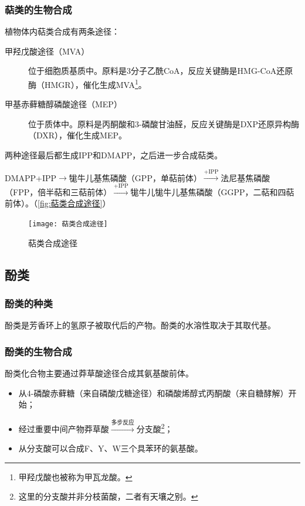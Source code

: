 \subsubsection{萜类的生物合成}

植物体内萜类合成有两条途径：

\begin{description}
	\item[甲羟戊酸途径（MVA）] 位于细胞质基质中。原料是3分子乙酰CoA，反应关键酶是HMG-CoA还原酶（HMGR），催化生成MVA\footnote{甲羟戊酸也被称为甲瓦龙酸。}。
	\item[甲基赤藓糖醇磷酸途径（MEP）] 位于质体中。原料是丙酮酸和3-磷酸甘油醛，反应关键酶是DXP还原异构酶（DXR），催化生成MEP。
\end{description}

两种途径最后都生成IPP和DMAPP，之后进一步合成萜类。

DMAPP+IPP$\longrightarrow$牻牛儿基焦磷酸（GPP，单萜前体）$\xrightarrow{\text{+IPP}}$法尼基焦磷酸（FPP，倍半萜和三萜前体）$\xrightarrow{\text{+IPP}}$牻牛儿牻牛儿基焦磷酸（GGPP，二萜和四萜前体）。（\autoref{fig:萜类合成途径}）

\begin{figure}[htbp]
	\centering
	\texttt{[image: 萜类合成途径]}
	\caption{萜类合成途径}
	\label{fig:萜类合成途径}
\end{figure}

\subsection{酚类}

\subsubsection{酚类的种类}

酚类是芳香环上的氢原子被取代后的产物。酚类的水溶性取决于其取代基。

\subsubsection{酚类的生物合成}

酚类化合物主要通过莽草酸途径合成其氨基酸前体。

\begin{itemize}
	\item 从4-磷酸赤藓糖（来自磷酸戊糖途径）和磷酸烯醇式丙酮酸（来自糖酵解）开始；
	\item 经过重要中间产物莽草酸$\xrightarrow{\text{多步反应}}$分支酸\footnote{这里的分支酸{\color{red}并非}分枝菌酸，二者有天壤之别。}；
	\item 从分支酸可以合成F、Y、W三个具苯环的氨基酸。
\end{itemize}

